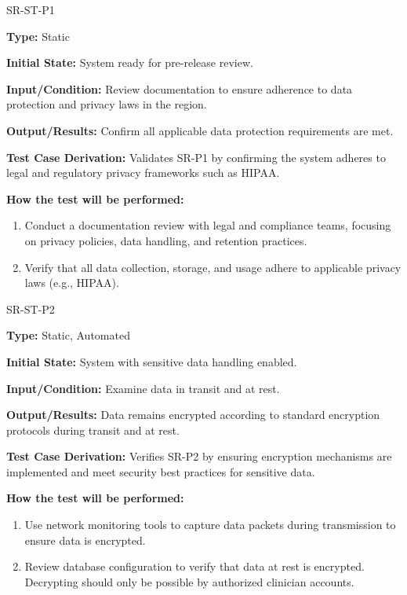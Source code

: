 \documentclass[12pt, titlepage]{article}
\begin{document}
\begin{itemize}
  \begin{item}
    SR-ST-P1
    \begin{mdframed}[linewidth=0.5mm]
      \textbf{Type:} Static \par
      \textbf{Initial State:} System ready for pre-release review. \par
      \textbf{Input/Condition:} Review documentation to ensure adherence to data protection and privacy laws in the region. \par
      \textbf{Output/Results:} Confirm all applicable data protection requirements are met. \par
      \textbf{Test Case Derivation:} Validates SR-P1 by confirming the system adheres to legal and regulatory privacy frameworks such as HIPAA. \par
      \textbf{How the test will be performed:}
      \begin{enumerate}[noitemsep]
        \item Conduct a documentation review with legal and compliance teams, focusing on privacy policies, data handling, and retention practices.
        \item Verify that all data collection, storage, and usage adhere to applicable privacy laws (e.g., HIPAA).
      \end{enumerate}
    \end{mdframed}
  \end{item}

  \begin{item}
    SR-ST-P2
    \begin{mdframed}[linewidth=0.5mm]
      \textbf{Type:} Static, Automated \par
      \textbf{Initial State:} System with sensitive data handling enabled. \par
      \textbf{Input/Condition:} Examine data in transit and at rest. \par
      \textbf{Output/Results:} Data remains encrypted according to standard encryption protocols during transit and at rest. \par
      \textbf{Test Case Derivation:} Verifies SR-P2 by ensuring encryption mechanisms are implemented and meet security best practices for sensitive data. \par
      \textbf{How the test will be performed:}
      \begin{enumerate}[noitemsep]
        \item Use network monitoring tools to capture data packets during transmission to ensure data is encrypted.
        \item Review database configuration to verify that data at rest is encrypted. \\ Decrypting should only be 
        possible by authorized clinician accounts.
      \end{enumerate}
    \end{mdframed}
  \end{item}


\end{itemize}
\end{document}
